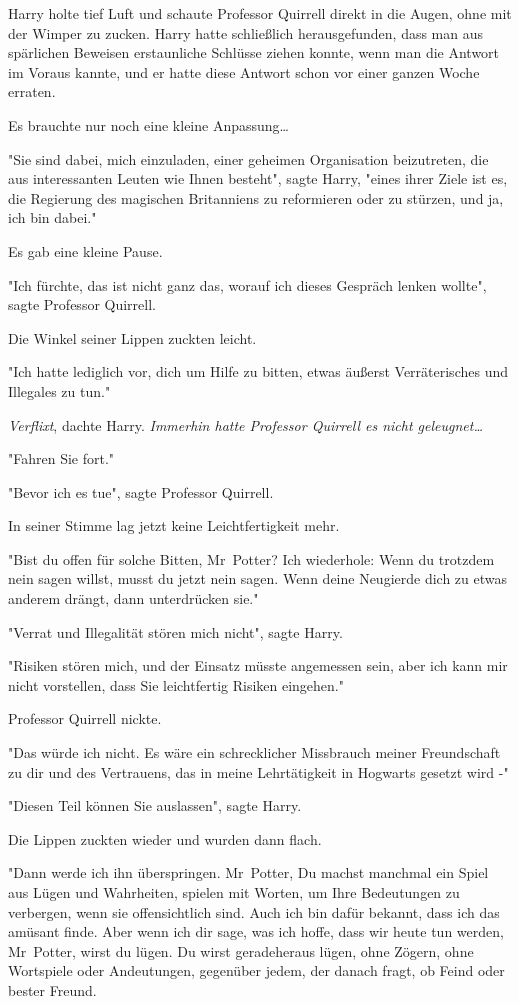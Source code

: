 {Harry holte tief Luft und schaute Professor Quirrell direkt in die Augen, ohne mit der Wimper zu zucken. Harry hatte schließlich herausgefunden, dass man aus spärlichen Beweisen erstaunliche Schlüsse ziehen konnte, wenn man die Antwort im Voraus kannte, und er hatte diese Antwort schon vor einer ganzen Woche erraten.

Es brauchte nur noch eine kleine Anpassung…

"Sie sind dabei, mich einzuladen, einer geheimen Organisation beizutreten, die aus interessanten Leuten wie Ihnen besteht", sagte Harry, "eines ihrer Ziele ist es, die Regierung des magischen Britanniens zu reformieren oder zu stürzen, und ja, ich bin dabei."

Es gab eine kleine Pause.

"Ich fürchte, das ist nicht ganz das, worauf ich dieses Gespräch lenken wollte", sagte Professor Quirrell.

Die Winkel seiner Lippen zuckten leicht.

"Ich hatte lediglich vor, dich um Hilfe zu bitten, etwas äußerst Verräterisches und Illegales zu tun."

\emph{Verflixt}, dachte Harry. \emph{Immerhin hatte Professor Quirrell es nicht geleugnet…}

"Fahren Sie fort."

"Bevor ich es tue", sagte Professor Quirrell.

In seiner Stimme lag jetzt keine Leichtfertigkeit mehr.

"Bist du offen für solche Bitten, Mr~Potter? Ich wiederhole: Wenn du trotzdem nein sagen willst, musst du jetzt nein sagen. Wenn deine Neugierde dich zu etwas anderem drängt, dann unterdrücken sie."

"Verrat und Illegalität stören mich nicht", sagte Harry.

"Risiken stören mich, und der Einsatz müsste angemessen sein, aber ich kann mir nicht vorstellen, dass Sie leichtfertig Risiken eingehen."

Professor Quirrell nickte.

"Das würde ich nicht. Es wäre ein schrecklicher Missbrauch meiner Freundschaft zu dir und des Vertrauens, das in meine Lehrtätigkeit in Hogwarts gesetzt wird -"

"Diesen Teil können Sie auslassen", sagte Harry.

Die Lippen zuckten wieder und wurden dann flach.

"Dann werde ich ihn überspringen. Mr~Potter, Du machst manchmal ein Spiel aus Lügen und Wahrheiten, spielen mit Worten, um Ihre Bedeutungen zu verbergen, wenn sie offensichtlich sind. Auch ich bin dafür bekannt, dass ich das amüsant finde. Aber wenn ich dir sage, was ich hoffe, dass wir heute tun werden, Mr~Potter, wirst du lügen. Du wirst geradeheraus lügen, ohne Zögern, ohne Wortspiele oder Andeutungen, gegenüber jedem, der danach fragt, ob Feind oder bester Freund.

}
